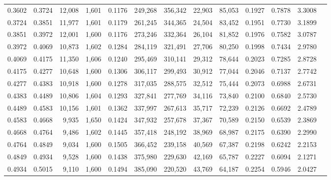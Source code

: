 \begin{tabular}{rrrrrrrrrrrrr}
0.3602 & 0.3724 & 12,008 & 1,601 &                                     0.1176 & 249,268 & 356,342 &  22,903 &  85,053 & 0.1927 & 0.7878 & 3.3008 \\
0.3724 & 0.3851 & 11,977 & 1,601 &                                     0.1179 & 261,245 & 344,365 &  24,504 &  83,452 & 0.1951 & 0.7730 & 3.1899 \\
0.3851 & 0.3972 & 12,001 & 1,600 &                                     0.1176 & 273,246 & 332,364 &  26,104 &  81,852 & 0.1976 & 0.7582 & 3.0787 \\
0.3972 & 0.4069 & 10,873 & 1,602 &                                     0.1284 & 284,119 & 321,491 &  27,706 &  80,250 & 0.1998 & 0.7434 & 2.9780 \\
0.4069 & 0.4175 & 11,350 & 1,606 &                                     0.1240 & 295,469 & 310,141 &  29,312 &  78,644 & 0.2023 & 0.7285 & 2.8728 \\
0.4175 & 0.4277 & 10,648 & 1,600 &                                     0.1306 & 306,117 & 299,493 &  30,912 &  77,044 & 0.2046 & 0.7137 & 2.7742 \\
0.4277 & 0.4383 & 10,918 & 1,600 &                                     0.1278 & 317,035 & 288,575 &  32,512 &  75,444 & 0.2073 & 0.6988 & 2.6731 \\
0.4383 & 0.4489 & 10,806 & 1,604 &                                     0.1293 & 327,841 & 277,769 &  34,116 &  73,840 & 0.2100 & 0.6840 & 2.5730 \\
0.4489 & 0.4583 & 10,156 & 1,601 &                                     0.1362 & 337,997 & 267,613 &  35,717 &  72,239 & 0.2126 & 0.6692 & 2.4789 \\
0.4583 & 0.4668 &  9,935 & 1,650 &                                     0.1424 & 347,932 & 257,678 &  37,367 &  70,589 & 0.2150 & 0.6539 & 2.3869 \\
0.4668 & 0.4764 &  9,486 & 1,602 &                                     0.1445 & 357,418 & 248,192 &  38,969 &  68,987 & 0.2175 & 0.6390 & 2.2990 \\
0.4764 & 0.4849 &  9,034 & 1,600 &                                     0.1505 & 366,452 & 239,158 &  40,569 &  67,387 & 0.2198 & 0.6242 & 2.2153 \\
0.4849 & 0.4934 &  9,528 & 1,600 &                                     0.1438 & 375,980 & 229,630 &  42,169 &  65,787 & 0.2227 & 0.6094 & 2.1271 \\
0.4934 & 0.5015 &  9,110 & 1,600 &                                     0.1494 & 385,090 & 220,520 &  43,769 &  64,187 & 0.2254 & 0.5946 & 2.0427 \\

\end{tabular}
